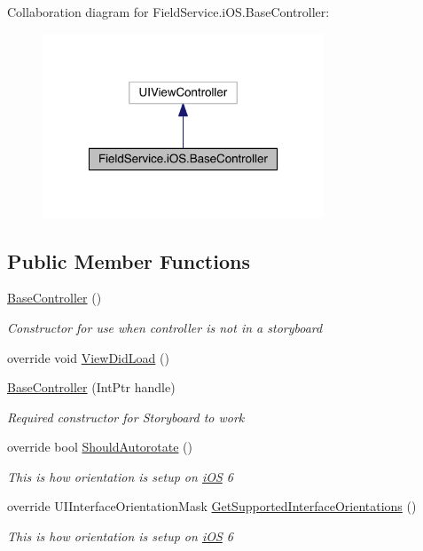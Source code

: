 Collaboration diagram for Field\+Service.\+i\+O\+S.\+Base\+Controller\+:
\nopagebreak
\begin{figure}[H]
\begin{center}
\leavevmode
\includegraphics[width=238pt]{class_field_service_1_1i_o_s_1_1_base_controller__coll__graph}
\end{center}
\end{figure}
\subsection*{Public Member Functions}
\begin{DoxyCompactItemize}
\item 
\hyperlink{class_field_service_1_1i_o_s_1_1_base_controller_a33b403b02a8506f2cddc3eb73df9608c}{Base\+Controller} ()
\begin{DoxyCompactList}\small\item\em Constructor for use when controller is not in a storyboard \end{DoxyCompactList}\item 
override void \hyperlink{class_field_service_1_1i_o_s_1_1_base_controller_a6ca2574cf36d956fc646416198e05143}{View\+Did\+Load} ()
\item 
\hyperlink{class_field_service_1_1i_o_s_1_1_base_controller_aed19af307fcf23d335cae74e7aadc488}{Base\+Controller} (Int\+Ptr handle)
\begin{DoxyCompactList}\small\item\em Required constructor for Storyboard to work \end{DoxyCompactList}\item 
override bool \hyperlink{class_field_service_1_1i_o_s_1_1_base_controller_ab91e9cccf9de7a6563c0709d00a985cf}{Should\+Autorotate} ()
\begin{DoxyCompactList}\small\item\em This is how orientation is setup on \hyperlink{namespace_field_service_1_1i_o_s}{i\+O\+S} 6 \end{DoxyCompactList}\item 
override U\+I\+Interface\+Orientation\+Mask \hyperlink{class_field_service_1_1i_o_s_1_1_base_controller_a4aeb12a1d9bacfce8d1dd3611cea2684}{Get\+Supported\+Interface\+Orientations} ()
\begin{DoxyCompactList}\small\item\em This is how orientation is setup on \hyperlink{namespace_field_service_1_1i_o_s}{i\+O\+S} 6 \end{DoxyCompactList}\end{DoxyCompactItemize}
